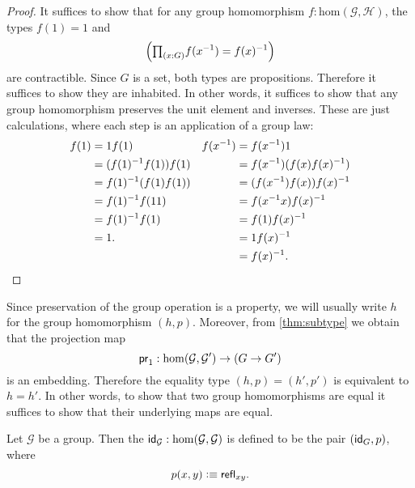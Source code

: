\begin{proof}
It suffices to show that for any group homomorphism $f:\mathrm{hom}(\mathcal{G},\mathcal{H})$, the types $f(1)=1$ and 
\begin{equation*}
\Big(\prd{x:G}f(x^{-1})=f(x)^{-1}\Big)
\end{equation*}
are contractible. Since $G$ is a set, both types are propositions. Therefore it suffices to show they are inhabited. In other words, it suffices to show that any group homomorphism preserves the unit element and inverses. These are just calculations, where each step is an application of a group law:
\begin{align*}
f(1) & = 1f(1)               & f(x^{-1}) & = f(x^{-1})1 \\
     & = (f(1)^{-1}f(1))f(1) &           & = f(x^{-1})(f(x)f(x)^{-1}) \\
     & = f(1)^{-1}(f(1)f(1)) &           & = (f(x^{-1})f(x))f(x)^{-1} \\
     & = f(1)^{-1}f(11)      &           & = f(x^{-1}x)f(x)^{-1} \\
     & = f(1)^{-1}f(1)       &           & = f(1)f(x)^{-1} \\
     & = 1.                  &           & = 1f(x)^{-1} \\
     &                       &           & = f(x)^{-1}.\qedhere
\end{align*}
\end{proof}

\begin{rmk}
Since preservation of the group operation is a property, we will usually write $h$ for the group homomorphism $(h,p)$.
Moreover, from \cref{thm:subtype} we obtain that the projection map
\begin{equation*}
\proj 1:\mathrm{hom}(\mathcal{G},\mathcal{G}')\to (G\to G')
\end{equation*}
is an embedding. Therefore the equality type $(h,p)=(h',p')$ is equivalent to $h=h'$. In other words, to show that two group homomorphisms are equal it suffices to show that their underlying maps are equal.
\end{rmk}

\begin{defn}
Let $\mathcal{G}$ be a group. Then the  $\idfunc[\mathcal{G}]:\mathrm{hom}(\mathcal{G},\mathcal{G})$ is defined to be the pair $(\idfunc[G],p)$, where 
\begin{equation*}
p(x,y)\defeq \refl{xy}. 
\end{equation*}
\end{defn}

